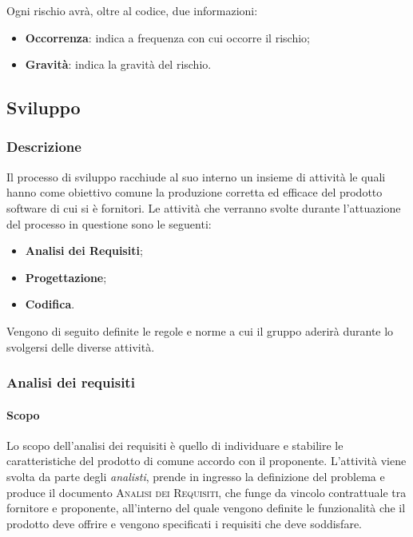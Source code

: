 Ogni rischio avrà, oltre al codice, due informazioni:
\begin{itemize}
	\item \textbf{Occorrenza}: indica a frequenza con cui occorre il rischio;
	\item \textbf{Gravità}: indica la gravità del rischio.
\end{itemize}

\subsection{Sviluppo}
\label{sub:sviluppo}

\subsubsection{Descrizione}
\label{ssub:sviluppo:descrizione}

Il processo di sviluppo racchiude al suo interno un insieme di attività le quali hanno come obiettivo comune la produzione corretta ed
efficace del prodotto software di cui si è fornitori. Le attività che verranno svolte durante l'attuazione del processo in questione sono
le seguenti:
\begin{itemize}
	\item \textbf{Analisi dei Requisiti};
	\item \textbf{Progettazione};
	\item \textbf{Codifica}.
\end{itemize}
Vengono di seguito definite le regole e norme a cui il gruppo aderirà durante lo svolgersi delle diverse attività.

\subsubsection{Analisi dei requisiti}
\label{ssub:analisi}

\paragraph{Scopo}
\label{par:analisi:scopo}

Lo scopo dell'analisi dei requisiti è quello di individuare e stabilire le caratteristiche del prodotto di comune accordo con il proponente.
L'attività viene svolta da parte degli \emph{analisti}, prende in ingresso la definizione del problema e produce il documento
\textsc{Analisi dei Requisiti}, che funge da vincolo contrattuale tra fornitore e proponente, all'interno del quale vengono definite
le funzionalità che il prodotto deve offrire e vengono specificati i requisiti che deve soddisfare.

